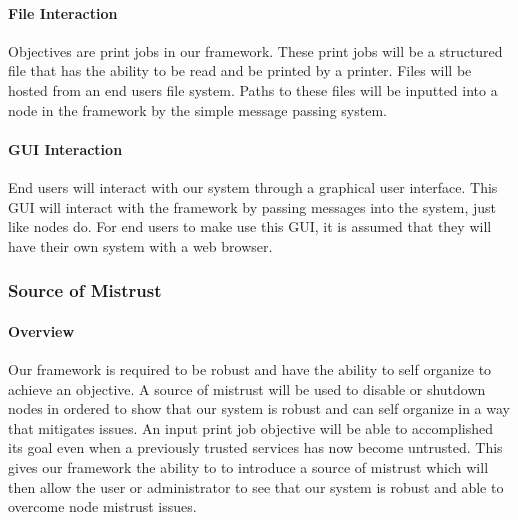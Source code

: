 \paragraph{File Interaction}
Objectives are print jobs in our framework. These print jobs will be a structured file that has the ability to be read and be printed by a printer. Files will be hosted from an end users file system. Paths to these files will be inputted into a node in the framework by the simple message passing system. 


\paragraph{GUI Interaction}
End users will interact with our system through a graphical user interface. This GUI will interact with the framework by passing messages into the system, just like nodes do. For end users to make use this GUI, it is assumed that they will have their own system with a web browser.


\subsubsection{Source of Mistrust}
\paragraph{Overview} 
Our framework is required to be robust and have the ability to self organize to achieve an objective. A source of mistrust will be used to disable or shutdown nodes in ordered to show that our system is robust and can self organize in a way that mitigates issues. An input print job objective will be able to accomplished its goal even when a previously trusted services has now become untrusted. This gives our framework the ability to to introduce a source of mistrust which will then allow the user or administrator to see that our system is robust and able to overcome node mistrust issues.


